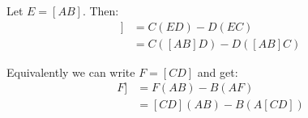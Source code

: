 \documentclass{article}
\begin{document}
\begin{enumerate}[1)]
        Let $E = [AB]$. Then:
        \begin{align*}
            [E[CD]] &= C(ED) - D(EC) \\
                    &= C([AB]D) - D([AB]C)
        \end{align*}

        Equivalently we can write $F = [CD]$ and get:
        \begin{align*}
            [[AB]F] &= F(AB) - B(AF) \\
                    &= [CD](AB) - B(A[CD])
        \end{align*}
\end{enumerate}
\end{document}
